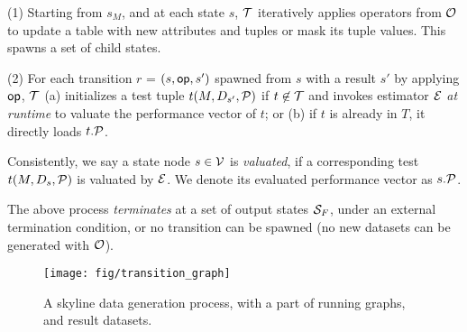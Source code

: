 \sstab 
(1) Starting from $s_M$, and at each state $s$, $\T$ iteratively applies operators from $\O$ to update a table with new attributes and tuples or mask its tuple values. This spawns a set of child states. 

\sstab 
(2) For each transition $r$ = $(s, \kw{op}, s')$ 
spawned from $s$ with a result $s'$ by applying  $\kw{op}$, $\T$ 
(a) initializes a test tuple $t(M, D_{s'}, \P)$ 
if $t\not\in \T$ and invokes 
estimator $\E$ {\em at runtime} to 
valuate the performance vector of
$t$; or (b) if $t$ is already in $T$, 
it directly loads $t.\P$. 

Consistently, we say a state node $s\in \V$ is {\em valuated}, 
if a corresponding test $t(M, D_s, \P)$ is valuated by 
$\E$. We denote  
its evaluated performance vector as $s.\P$.  

\vspace{.5ex}
The above process {\em terminates} at a set of output states $\S_F$,  
under 
an external termination condition, 
or no transition can be spawned 
(no new datasets can be generated with $\O$).  







\begin{figure}[tb!]
\centerline{\texttt{[image: fig/transition\_graph]}}
\centering
\vspace{-1ex}
\caption{A skyline data generation process, with a part of running graphs, and result datasets.}
\label{fig:transition}
\vspace{-2ex}
\end{figure}



